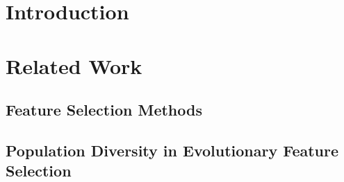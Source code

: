 
\section{Introduction}
%
%
%
%
%
%


\section{Related Work}

\subsection{Feature Selection Methods}

\subsection{Population Diversity in Evolutionary Feature Selection}

